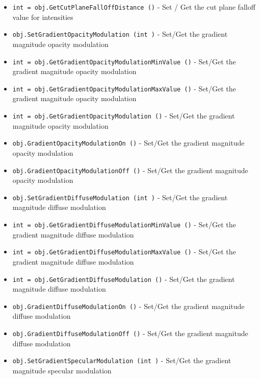 \begin{itemize}
\item  \verb|int = obj.GetCutPlaneFallOffDistance ()| -  Set / Get the cut plane falloff value for intensities

\item  \verb|obj.SetGradientOpacityModulation (int )| -  Set/Get the gradient magnitude opacity modulation 

\item  \verb|int = obj.GetGradientOpacityModulationMinValue ()| -  Set/Get the gradient magnitude opacity modulation 

\item  \verb|int = obj.GetGradientOpacityModulationMaxValue ()| -  Set/Get the gradient magnitude opacity modulation 

\item  \verb|int = obj.GetGradientOpacityModulation ()| -  Set/Get the gradient magnitude opacity modulation 

\item  \verb|obj.GradientOpacityModulationOn ()| -  Set/Get the gradient magnitude opacity modulation 

\item  \verb|obj.GradientOpacityModulationOff ()| -  Set/Get the gradient magnitude opacity modulation 

\item  \verb|obj.SetGradientDiffuseModulation (int )| -  Set/Get the gradient magnitude diffuse modulation 

\item  \verb|int = obj.GetGradientDiffuseModulationMinValue ()| -  Set/Get the gradient magnitude diffuse modulation 

\item  \verb|int = obj.GetGradientDiffuseModulationMaxValue ()| -  Set/Get the gradient magnitude diffuse modulation 

\item  \verb|int = obj.GetGradientDiffuseModulation ()| -  Set/Get the gradient magnitude diffuse modulation 

\item  \verb|obj.GradientDiffuseModulationOn ()| -  Set/Get the gradient magnitude diffuse modulation 

\item  \verb|obj.GradientDiffuseModulationOff ()| -  Set/Get the gradient magnitude diffuse modulation 

\item  \verb|obj.SetGradientSpecularModulation (int )| -  Set/Get the gradient magnitude specular modulation 


\end{itemize}
